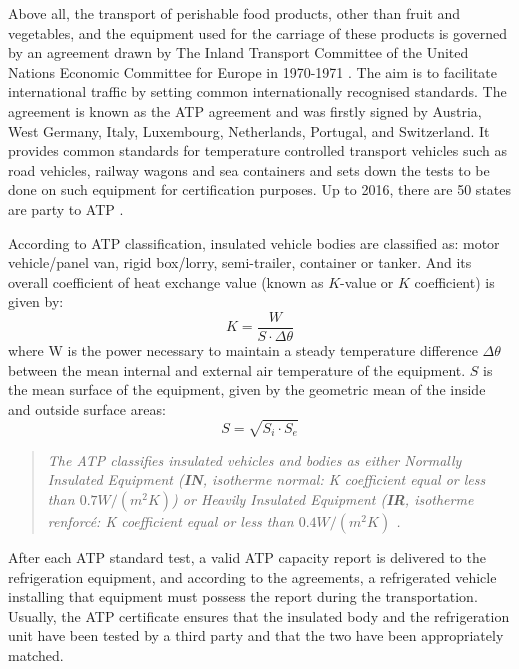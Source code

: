 Above all, the transport of perishable food products, other than fruit and vegetables, and the equipment used for the carriage of these products is governed by an agreement drawn by The Inland Transport Committee of the United Nations Economic Committee for Europe in 1970-1971 \citep{Geneva1970}. The aim is to facilitate international traffic by setting common internationally recognised standards. The agreement is known as the ATP agreement and was firstly signed by Austria, West Germany, Italy, Luxembourg, Netherlands, Portugal, and Switzerland.  It provides common standards for temperature controlled transport vehicles such as road vehicles, railway wagons and sea containers and sets down the tests to be done on such equipment for certification purposes. Up to 2016, there are 50 states are party to ATP \citep{ATP_wiki}.


According to ATP classification, insulated vehicle bodies are classified as: motor vehicle/panel van, rigid box/lorry, semi-trailer, container or tanker. And its overall coefficient of heat exchange value (known as $K$-value or $K$ coefficient) is given by:
\begin{equation}
K = \frac{W}{S\cdot \Delta \theta}
\end{equation}
where W is  the  power  necessary  to  maintain  a  steady  temperature  difference $\Delta \theta$ between  the  mean internal and external air temperature of the equipment. $S$ is the mean surface of the equipment, given by the geometric mean of the inside and outside surface areas:
\begin{equation}
S = \sqrt{S_i \cdot S_e}
\end{equation}

\begin{quote}
	\textit{The ATP classifies insulated vehicles and bodies as either Normally Insulated Equipment (\textbf{IN}, isotherme normal: K coefficient equal or less than $ 0.7 W/(m^2 K) $) or Heavily Insulated Equipment (\textbf{IR}, isotherme renforcé: K coefficient equal or less than $ 0.4 W/(m^2 K )$ \citep{Tassou2009}.}
\end{quote}

After each ATP standard test, a valid ATP capacity report is delivered to the refrigeration equipment, and according to the agreements, a refrigerated vehicle installing that equipment must possess the report during the transportation. Usually, the ATP certificate ensures that the insulated body and the refrigeration unit have been tested by a third party and that the two have been appropriately matched.

